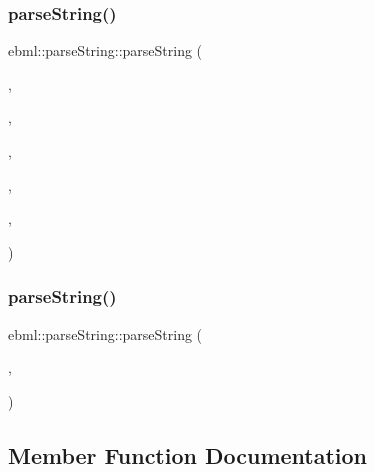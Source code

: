 \subsubsection{\texorpdfstring{parse\+String()}{parseString()}\hspace{0.1cm}{\footnotesize\ttfamily [4/5]}}
{\footnotesize\ttfamily ebml\+::parse\+String\+::parse\+String (\begin{DoxyParamCaption}\item[{\mbox{\hyperlink{namespaceebml_a86c5f604ddf12a74aa9812e997a58691}{ebml\+I\+D\+\_\+t}}}]{,  }\item[{\mbox{\hyperlink{namespaceebml_a2ccdfb60b23efb51fe07f9d066e23604}{vint\+Width\+\_\+t}}}]{,  }\item[{size\+\_\+t}]{,  }\item[{\mbox{\hyperlink{namespaceebml_a2ccdfb60b23efb51fe07f9d066e23604}{vint\+Width\+\_\+t}}}]{,  }\item[{off\+\_\+t}]{,  }\item[{const char $\ast$}]{ }\end{DoxyParamCaption})}

\mbox{\label{classebml_1_1parseString_a3274d8ebf9c24ef060b486b6b5db00e2}} 
\subsubsection{\texorpdfstring{parse\+String()}{parseString()}\hspace{0.1cm}{\footnotesize\ttfamily [5/5]}}
{\footnotesize\ttfamily ebml\+::parse\+String\+::parse\+String (\begin{DoxyParamCaption}\item[{const \mbox{\hyperlink{classebml_1_1parseFile}{parse\+File}} \&}]{,  }\item[{char $\ast$}]{ }\end{DoxyParamCaption})}



\subsection{Member Function Documentation}
\mbox{\label{classebml_1_1parseString_abb053ba094e647124133d7b9ab3a5f4d}} 
